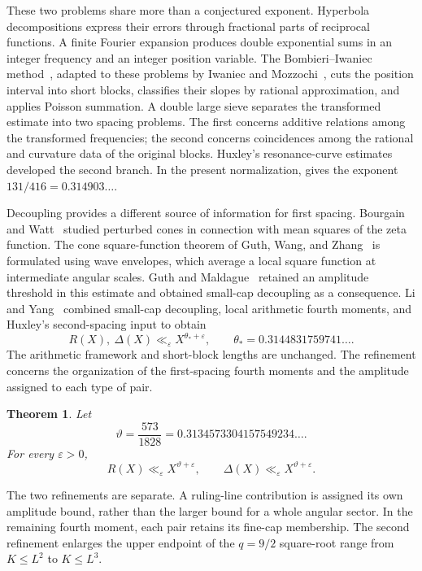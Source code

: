 \documentclass[11pt,reqno]{amsart}
\numberwithin{equation}{section}
\newtheorem{theorem}{Theorem}[section]
\theoremstyle{definition}
\theoremstyle{remark}
\newcommand{\eps}{\varepsilon}
\newcommand{\vth}{\vartheta}
\begin{document}
These two problems share more than a conjectured exponent. Hyperbola decompositions express their errors through fractional parts of reciprocal functions. A finite Fourier expansion produces double exponential sums in an integer frequency and an integer position variable.
The Bombieri--Iwaniec method~\cite{BI}, adapted to these problems by Iwaniec and Mozzochi~\cite{IM}, cuts the position interval into short blocks, classifies their slopes by rational approximation, and applies Poisson summation.
A double large sieve separates the transformed estimate into two spacing problems.
The first concerns additive relations among the transformed frequencies; the second concerns coincidences among the rational and curvature data of the original blocks.
Huxley's resonance-curve estimates~\cite{H90,H93,H03} developed the second branch. In the present normalization, \cite{H03} gives the exponent $131/416=0.314903\ldots$.

Decoupling provides a different source of information for first spacing.
Bourgain and Watt~\cite{BW18} studied perturbed cones in connection with mean squares of the zeta function.
The cone square-function theorem of Guth, Wang, and Zhang~\cite{GWZ} is formulated using wave envelopes, which average a local square function at intermediate angular scales.
Guth and Maldague~\cite{GM} retained an amplitude threshold in this estimate and obtained small-cap decoupling as a consequence.
Li and Yang~\cite{LY} combined small-cap decoupling, local arithmetic fourth moments, and Huxley's second-spacing input to obtain
\begin{equation}\label{eq:lyexponent}
 R(X),\ \Delta(X)\ll_\eps X^{\theta_*+\eps},
 \qquad \theta_*=0.3144831759741\ldots.
\end{equation}
The arithmetic framework and short-block lengths are unchanged. The refinement concerns the organization of the first-spacing fourth moments and the amplitude assigned to each type of pair.

\begin{theorem}\label{thm:main}
Let
\begin{equation}\label{eq:theta}
 \vth=\frac{573}{1828}=0.3134573304157549234\ldots.
\end{equation}
For every $\eps>0$,
\begin{equation}\label{eq:main}
 R(X)\ll_\eps X^{\vth+\eps},\qquad
 \Delta(X)\ll_\eps X^{\vth+\eps}.
\end{equation}
\end{theorem}

The two refinements are separate. A ruling-line contribution is assigned its own amplitude bound, rather than the larger bound for a whole angular sector. In the remaining fourth moment, each pair retains its fine-cap membership. The second refinement enlarges the upper endpoint of the $q=9/2$ square-root range from $K\le L^2$ to $K\le L^3$.
\end{document}
